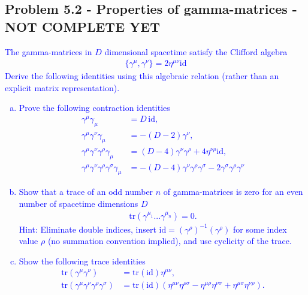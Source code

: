 \documentclass[../main.tex]{subfiles}
\begin{document}
\subsection{Problem 5.2 - Properties of gamma-matrices - NOT COMPLETE YET}
\textcolor{blue}{
The gamma-matrices in $D$ dimensional spacetime satisfy the Cliﬀord algebra
\begin{align}
\{\gamma^\mu,\gamma^\nu\}= 2\eta^{\mu\nu}\text{id}
\end{align}
Derive the following identities using this algebraic relation (rather than an explicit matrix
representation).
\begin{enumerate}[a)]
\item Prove the following contraction identities
\begin{align}
\gamma^\mu\gamma_\mu 
&= D\,\text{id},\\
\gamma^\mu\gamma^\nu\gamma_\mu 
&=-(D-2)\gamma^\nu,\\
\gamma^\mu\gamma^\nu\gamma^\rho\gamma_\mu 
&=(D-4)\gamma^\nu\gamma^\rho+4\eta^{\nu\rho}\text{id},\\
\gamma^\mu\gamma^\nu\gamma^\rho\gamma^\sigma\gamma_\mu 
&=-(D-4)\gamma^\nu\gamma^\rho\gamma^\sigma-2\gamma^\sigma\gamma^\rho\gamma^\nu
\end{align}
\item Show that a trace of an odd number $n$ of gamma-matrices is zero for an even number
of spacetime dimensions $D$
\begin{align}
\text{tr}(\gamma^{\mu_1}...\gamma^{\mu_n}) = 0. 
\end{align}
Hint: Eliminate double indices, insert $\text{id}=(\gamma^\rho)^{-1}(\gamma^\rho)$ for some index value $\rho$ (no summation convention implied), and use cyclicity of the trace.
\item Show the following trace identities
\begin{align}
\text{tr}(\gamma^\mu\gamma^\nu) 
&= \text{tr}(\text{id}) \eta^{\mu\nu},\\
\text{tr}(\gamma^\mu\gamma^\nu\gamma^\rho\gamma^\sigma)
&= \text{tr}(\text{id}) (
\eta^{\mu\nu}\eta^{\rho\sigma}
-\eta^{\mu\rho}\eta^{\nu\sigma}
+\eta^{\mu\sigma}\eta^{\nu\rho}).
\end{align}
\end{enumerate}
}
\end{document}
